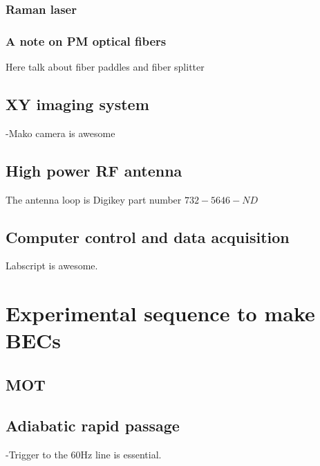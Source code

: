 \subsubsection{Raman laser}

\subsubsection{A note on PM optical fibers}

Here talk about fiber paddles and fiber splitter



\subsection{XY imaging system}
-Mako camera is awesome





\subsection{High power RF antenna}
\label{sec:high_power_rf_antenna}
The antenna loop is Digikey part number $732-5646-ND$


\subsection{Computer control and data acquisition}
Labscript is awesome. 


\section{Experimental sequence to make BECs}
\label{sec:making-becs}

\subsection{MOT}



\subsection{Adiabatic rapid passage}
\label{sec:arp}
-Trigger to the 60Hz line is essential. 

